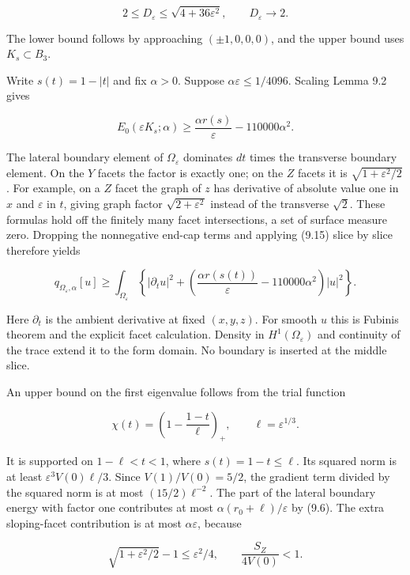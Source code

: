 \documentclass[11pt]{article}
\begin{document}
\[
2\le D_\varepsilon\le\sqrt{4+36\varepsilon^2},
\qquad D_\varepsilon\longrightarrow2.
\tag{9.14}
\]

The lower bound follows by approaching \((\pm1,0,0,0)\), and the upper
bound uses \(K_s\subset B_3\).

Write \(s(t)=1-|t|\) and fix \(\alpha>0\). Suppose
\(\alpha\varepsilon\le1/4096\). Scaling Lemma 9.2 gives

\[
E_0(\varepsilon K_s;\alpha)
\ge\frac{\alpha r(s)}{\varepsilon}-110000\alpha^2.
\tag{9.15}
\]

The lateral boundary element of \(\Omega_\varepsilon\) dominates \(dt\)
times the transverse boundary element. On the \(Y\) facets the factor is
exactly one; on the \(Z\) facets it is \(\sqrt{1+\varepsilon^2/2}\). For
example, on a \(Z\) facet the graph of \(z\) has derivative of absolute
value one in \(x\) and \(\varepsilon\) in \(t\), giving graph factor
\(\sqrt{2+\varepsilon^2}\) instead of the transverse \(\sqrt2\). These
formulas hold off the finitely many facet intersections, a set of
surface measure zero. Dropping the nonnegative end-cap terms and
applying (9.15) slice by slice therefore yields

\[
q_{\Omega_\varepsilon,\alpha}[u]\ge
\int_{\Omega_\varepsilon}\left\{
 |\partial_tu|^2+
 \left(\frac{\alpha r(s(t))}{\varepsilon}-110000\alpha^2\right)|u|^2
\right\}.
\tag{9.16}
\]

Here \(\partial_t\) is the ambient derivative at fixed \((x,y,z)\). For
smooth \(u\) this is Fubini\textquotesingle s theorem and the explicit
facet calculation. Density in \(H^1(\Omega_\varepsilon)\) and continuity
of the trace extend it to the form domain. No boundary is inserted at
the middle slice.

An upper bound on the first eigenvalue follows from the trial function

\[
\chi(t)=\left(1-\frac{1-t}{\ell}\right)_+,
\qquad \ell=\varepsilon^{1/3}.
\tag{9.17}
\]

It is supported on \(1-\ell<t<1\), where \(s(t)=1-t\le\ell\). Its
squared norm is at least \(\varepsilon^3V(0)\ell/3\). Since
\(V(1)/V(0)=5/2\), the gradient term divided by the squared norm is at
most \((15/2)\ell^{-2}\). The part of the lateral boundary energy with
factor one contributes at most \(\alpha(r_0+\ell)/\varepsilon\) by
(9.6). The extra sloping-facet contribution is at most
\(\alpha\varepsilon\), because

\[
\sqrt{1+\varepsilon^2/2}-1\le\varepsilon^2/4,
\qquad \frac{S_Z}{4V(0)}<1.
\tag{9.18}
\]
\end{document}
